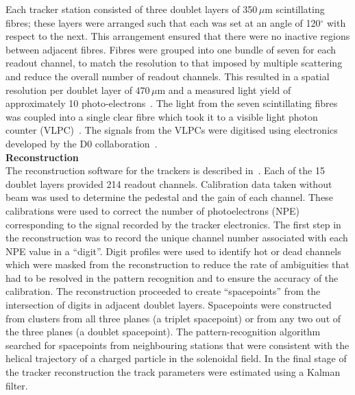Each tracker station consisted of three doublet layers of 350\,$\mu$m
scintillating fibres; these layers were arranged such that each was
set at an angle of 120$^\circ$ with respect to the next.
This arrangement ensured that there were no inactive regions between
adjacent fibres.
Fibres were grouped into one bundle of seven for each readout
channel, to match the resolution to that imposed by multiple
scattering and reduce the overall number of readout channels.
This resulted in a spatial resolution per doublet layer of 470\,$\mu$m
and a measured light yield of approximately 10
photo-electrons~\cite{Ellis:2010bb}.
The light from the seven scintillating fibres was coupled into a
single clear fibre which took it to a visible light photon counter
(VLPC)~\cite{VLPC}.
The signals from the VLPCs were digitised using electronics developed
by the D0 collaboration~\cite{Abazov:2005pn}. \\

\noindent\textbf{Reconstruction} \\
\noindent
The reconstruction software for the trackers is described
in~\cite{Dobbs:2016ejn}.
Each of the 15 doublet layers provided 214 readout channels.
Calibration data taken without beam was used to determine the pedestal and the gain of each channel.
These calibrations were used to correct the number of photoelectrons
(NPE) corresponding to the signal recorded by the tracker
electronics.
The first step in the reconstruction was to record the unique channel
number associated with each NPE value in a ``digit''.
Digit profiles were used to identify hot or dead channels which
were masked from the reconstruction to reduce the rate of ambiguities
that had to be resolved in the pattern recognition and to ensure the
accuracy of the calibration.
The reconstruction proceeded to create ``spacepoints'' from the
intersection of digits in adjacent doublet layers.
Spacepoints were constructed from clusters from all three planes (a
triplet spacepoint) or from any two out of the three planes (a doublet
spacepoint).
The pattern-recognition algorithm searched for spacepoints from
neighbouring stations that were consistent with the helical trajectory
of a charged particle in the solenoidal field.
In the final stage of the tracker reconstruction the track parameters
were estimated using a Kalman filter. \\

\newpage

